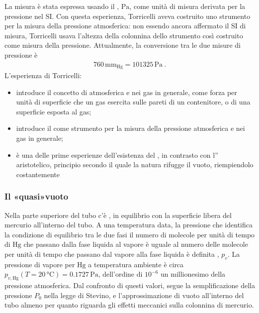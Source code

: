 \documentclass[letterpaper,10pt,italian]{jupyterBook}
\begin{document}
\sphinxAtStartPar
La misura è stata espressa usando il , \(\text{Pa}\), come unità di misura derivata per la pressione nel SI. Con questa esperienza, Torricelli aveva costruito uno strumento per la misura della pressione atmosferica: non essendo ancora affermato il SI di misura, Torricelli usava l’altezza della colonnina dello strumento così costruito come misura della pressione. Attualmente, la conversione tra le due misure di pressione è
\begin{equation*}
\begin{split}760 \, \text{mm}_{\text{Hg}} = 101325 \, \text{Pa} \ .\end{split}
\end{equation*}
\sphinxAtStartPar
L’esperienza di Torricelli:
\begin{itemize}
\item {} 
\sphinxAtStartPar
introduce il concetto di  atmosferica e nei gas in generale, come forza per unità di superficie che un gas esercita sulle pareti di un contenitore, o di una superficie esposta al gas;

\item {} 
\sphinxAtStartPar
introduce il  come strumento per la misura della pressione atmosferica e nei gas in generale;

\item {} 
\sphinxAtStartPar
è una delle prime esperienze dell’esistenza del , in contrasto con l” aristotelico, principio secondo il quale la natura rifugge il vuoto, riempiendolo costantemente

\end{itemize}
\subsubsection*{Il «quasi»\sphinxhyphen{}vuoto}

\sphinxAtStartPar
Nella parte superiore del tubo c’è , in equilibrio con la superficie libera del mercurio all’interno del tubo. A una temperatura data, la pressione che identifica la condizione di equilibrio tra le due fasi \sphinxhyphen{} il numero di molecole per unità di tempo di \(\text{Hg}\) che passano dalla fase liquida al vapore è uguale al numero delle molecole per unità di tempo che passano dal vapore alla fase liquida \sphinxhyphen{} è definita , \(p_v\). La pressione di vapore per \(\text{Hg}\) a temperatura ambiente è circa \(p_{v, \text{Hg}}(T=20 \, \text{°C}) = 0.1727 \, \text{Pa}\), dell’ordine di \(10^{-6}\) \sphinxhyphen{} un millionesimo \sphinxhyphen{} della pressione atmosferica. Dal confronto di questi valori, segue la semplificazione della pressione \(P_0\) nella legge di Stevino, e l’approssimazione di vuoto all’interno del tubo almeno per quanto riguarda gli effetti meccanici sulla colonnina di mercurio.
\end{document}
